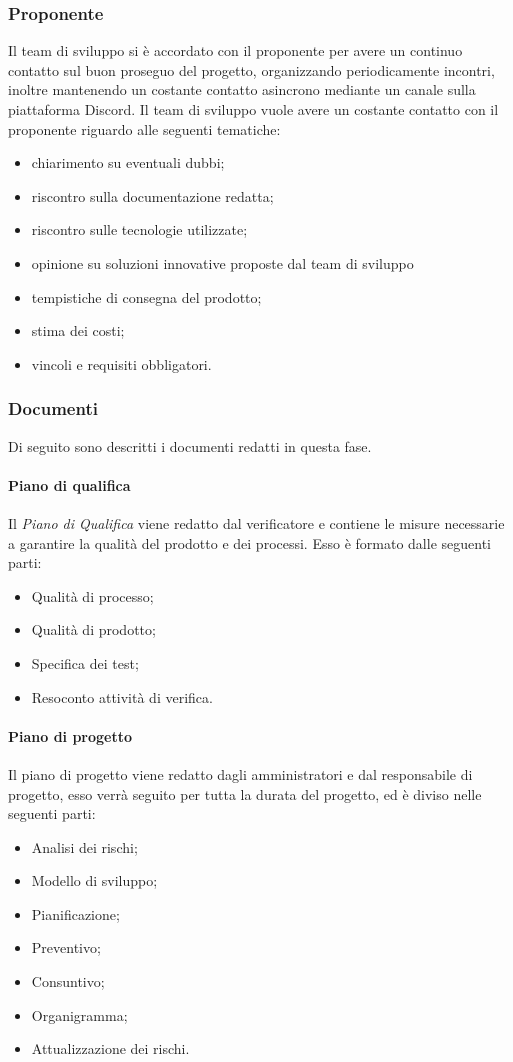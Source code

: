 \subsubsection{Proponente}\label{subsubsection: proponente_fornitura}
Il team di sviluppo si è accordato con il proponente per avere un continuo contatto sul buon proseguo del progetto, organizzando periodicamente incontri, inoltre mantenendo un costante contatto asincrono mediante un canale sulla piattaforma Discord.
Il team di sviluppo vuole avere un costante contatto con il proponente riguardo alle seguenti tematiche:
\begin {itemize}
    \item chiarimento su eventuali dubbi;
    \item riscontro sulla documentazione redatta;
    \item riscontro sulle tecnologie utilizzate;
    \item opinione su soluzioni innovative proposte dal team di sviluppo
    \item tempistiche di consegna del prodotto;
    \item stima dei costi;
    \item vincoli e requisiti obbligatori.
\end{itemize}
\subsubsection {Documenti}\label{subsubsection: documenti_fornitura}
Di seguito sono descritti i documenti redatti in questa fase.
\paragraph{Piano di qualifica}\label{paragraph: PdQ_fornitura}
Il \textit{Piano di Qualifica} viene redatto dal verificatore e contiene le misure necessarie a garantire la qualità del prodotto e dei processi.
Esso è formato dalle seguenti parti:
\begin{itemize}
    \item Qualità di processo;
    \item Qualità di prodotto;
    \item Specifica dei test;
    \item Resoconto attività di verifica.
\end{itemize}
\paragraph{Piano di progetto}\label{paragraph: PdP_fornitura}
Il piano di progetto viene redatto dagli amministratori e dal responsabile di progetto, esso verrà seguito per tutta la durata del progetto, ed è diviso nelle seguenti parti:
\begin{itemize}
    \item Analisi dei rischi;
    \item Modello di sviluppo;
    \item Pianificazione;
    \item Preventivo;
    \item Consuntivo;
    \item Organigramma;
    \item Attualizzazione dei rischi.
\end{itemize} 
